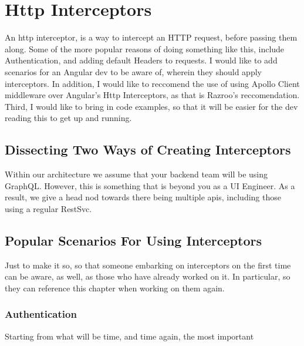 \section{ Http Interceptors }
\maketitle{}

An http interceptor, is a way to intercept an HTTP request, before passing them
along. Some of the more popular reasons of doing something like this, include 
Authentication, and adding default Headers to requests. I would like to add 
scenarios for an Angular dev to be aware of, wherein they should apply 
interceptors. In addition, I would like to reccomend the use of using Apollo 
Client middleware over Angular's Http Interceptors, as that is Razroo's 
reccomendation. Third, I would like to bring in code examples, so that it will
be easier for the dev reading this to get up and running.

\subsection{Dissecting Two Ways of Creating Interceptors}
Within our architecture we assume that your backend team will be using GraphQL. 
However, this is something that is beyond you as a UI Engineer. As a result,
we give a head nod towards there being multiple apis, including those using a 
regular RestSvc. 

\subsection{ Popular Scenarios For Using Interceptors }
Just to make it so, so that someone embarking on interceptors on the first 
time can be aware, as well, as those who have already worked on it. In
particular, so they can reference this chapter when working on them again. 

\subsubsection{ Authentication }
Starting from what will be time, and time again, the most important 